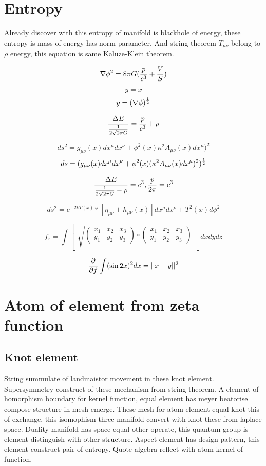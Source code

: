 \documentclass{jsarticle}
\begin{document}
\section{Entropy}
   Already discover with this entropy of manifold is blackhole of energy, these entropy is mass of energy has
norm parameter. And string theorem $ T_{\mu\nu}$  belong to $ \rho $ energy, this equation is same Kaluze-Klein theorem.


 $$ \nabla \phi^2 = 8 \pi G({p \over c^3} + {V \over S})$$

 $$  y = x $$
 $$  y = (\nabla \phi)^{1 \over 2} $$

  $$ {\Delta E \over {1 \over 2\sqrt{2 \pi G}}} = {p \over c^3} + \rho $$

  $$ ds^2 = g_{\mu\nu}(x)dx^{\mu}dx^{\nu} + \phi^2(x)\kappa^2 A_{\mu\nu}(x)dx^{\mu})^2 $$
  $$ ds = (g_{\mu\nu}(x)dx^{\mu}dx^{\nu} + \phi^2(x)(\kappa^2 A_{\mu\nu}(x)dx^{\mu})^2)^{1 \over 2} $$

  $$ {\Delta E \over {1 \over 2\sqrt{2 \pi G}} - \rho} = c^3, {p \over 2 \pi} = c^3 $$
    

  $$ ds^2 = e^{-2kT(x)|\phi|}[\eta_{\mu\nu} + \bar{h}_{\mu\nu}(x)]dx^{\mu}dx^{\nu} + T^2(x) d\phi^2 $$

  $$ f_{z} = \int \begin{bmatrix} \sqrt{\begin{pmatrix} x_{1} & x_{2} & x_{3} \\
     y_{1} & y_{2} & y_{3} \end{pmatrix}
     \circ
   \begin{pmatrix} x_{1} & x_{2} & x_{3} \\
     y_{1} & y_{2} & y_{3} \end{pmatrix}}_{}
     \end{bmatrix}dxdydz $$

     $$ {\partial \over \partial f} \int (\sin2x)^2dx = ||x - y||^2 $$

\section{Atom of element from zeta function}
\subsection{Knot element}

  String summulate of landmaistor movement in these knot element. Supersymmetry construct of these mechanism from
string theorem. A element of homorphism boundary for kernel function, equal element has meyer beatorise compose
structure in mesh emerge. These mesh for atom element equal knot this of exchange, this isomophism three manifold 
convert with knot these from laplace space. Duality manifold has space equal other operate, this quantum group is 
element distinguish with other structure. Aspect element has design pattern, this element construct pair of entropy.
Quote algebra reflect with atom kernel of function.
\end{document}
